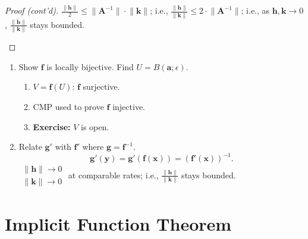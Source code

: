 \documentclass[letterpaper, reqno,11pt]{article}
\begin{document}
\begin{proof}[Proof (cont'd)]
   $\frac{\lVert \mathbf h \rVert}{2} \leq \lVert \mathbf A^{-1} \rVert \cdot \lVert \mathbf k \rVert$; i.e., $\frac{\lVert \mathbf h \rVert}{\lVert \mathbf k \rVert} \leq 2 \cdot \lVert \mathbf A^{-1} \rVert$; i.e., as $\mathbf h, \mathbf k \to 0$, $\frac{\lVert \mathbf h \rVert}{\lVert \mathbf k \rVert}$ stays bounded.

  \begin{figure}[H]
    \centering
  \end{figure}
\end{proof}

\begin{enumerate}
\item Show $\mathbf f$ is locally bijective. Find $U = B(\mathbf a; \epsilon)$.
  \begin{enumerate}
  \item $V = \mathbf f(U)$: $\mathbf f$ surjective.
  \item CMP used to prove $\mathbf f$ injective.
  \item {\bf Exercise:} $V$ is open.
  \end{enumerate}
\item Relate $\mathbf g'$ with $\mathbf f'$ where $\mathbf g = \mathbf f^{-1}$.
  \[ \mathbf g'(\mathbf y) = \mathbf g'(\mathbf f(\mathbf x)) = (\mathbf f'(\mathbf x))^{-1}. \]
   $\begin{array}{l}
      \lVert \mathbf h \rVert \to 0 \\
      \lVert \mathbf k \rVert \to 0
  \end{array}$ at comparable rates; i.e., $\frac{\lVert \mathbf h \rVert}{\lVert \mathbf k \rVert}$ stays bounded.
\end{enumerate}

\section{Implicit Function Theorem}
\end{document}
